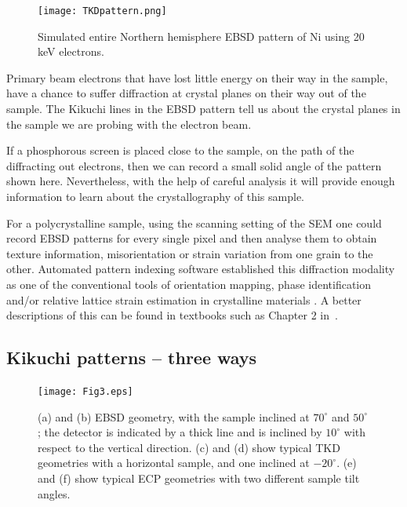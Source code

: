 \begin{figure}[ht]
\centering
\texttt{[image: TKDpattern.png]}
\caption[EBSD pattern of Ni northern hemisphere.]{Simulated entire Northern hemisphere  EBSD pattern of Ni using 20 keV electrons.}
\label{fig:tkspatter}
\end{figure}


Primary beam electrons that have lost little energy on their way in the sample, have a chance to suffer diffraction at crystal planes on their way out of the sample. The Kikuchi lines in the EBSD pattern tell us about the crystal planes in the sample we are probing with the electron beam. 


 If a phosphorous screen is placed close to the sample, on the path of the diffracting out electrons, then we can record a small solid angle of the pattern shown here. Nevertheless, with the help of careful analysis it will provide enough information to learn about the crystallography of this sample. 
 
 For a polycrystalline sample, using the scanning setting of the SEM one could record  EBSD patterns for every single pixel and then analyse them to obtain texture information, misorientation or strain variation from one grain to the other.  Automated pattern indexing software established this diffraction modality as one of the conventional tools of orientation mapping, phase identification and/or relative lattice strain estimation in crystalline materials \cite{schwartz2009a}. A better descriptions of this can be found in textbooks such as Chapter 2 in~\cite{Maitland07}.



\subsection{Kikuchi patterns -- three ways}
\label{sec:Kikuchi}



\begin{figure}[ht]
\centering\leavevmode
\texttt{[image: Fig3.eps]}%
\caption[EBSD, TKD and ECP set-up geometry.]{(a) and (b) EBSD geometry, with the sample inclined at $70^{\circ}$ and $50^{\circ}$; the detector is indicated by a thick line and is inclined by $10^{\circ}$ with respect to the vertical direction. (c) and (d) show typical TKD geometries with a horizontal sample, and one inclined at $-20^{\circ}$. (e) and (f) show typical ECP geometries with two different sample tilt angles.}
\label{fig:geometries}
\end{figure}



